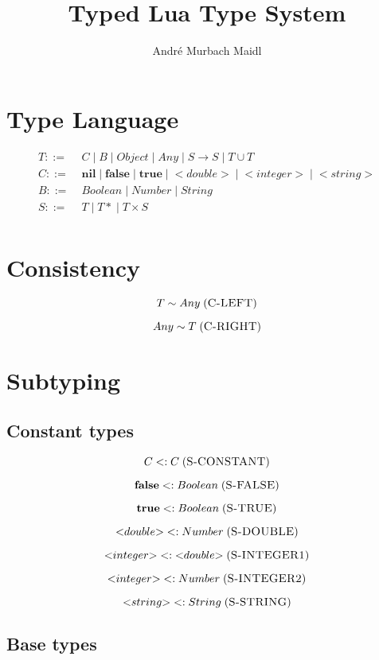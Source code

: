 \documentclass[12pt]{article}
\title{Typed Lua Type System}
\author{André Murbach Maidl}
\newcommand{\mylabel}[1]{\; (\textsc{#1})}
\newcommand{\subtype}{<:}
\newcommand{\pipe}{|\;}
\begin{document}
\maketitle

\section{Type Language}

\begin{align*}
T ::= \; & C \; \pipe B \; \pipe Object \; \pipe Any \; \pipe
S \rightarrow S \; \pipe T \cup T\\
C ::= \; & \mathbf{nil} \; \pipe \mathbf{false} \; \pipe \mathbf{true} \;
\pipe {<}double{>} \; \pipe {<}integer{>} \; \pipe {<}string{>}\\
B ::= \; & Boolean \; \pipe Number \; \pipe String\\
S ::= \; & T \; \pipe {T*} \; \pipe T \times S\\ 
\end{align*}

\section{Consistency}

\[
T \sim Any
\mylabel{C-LEFT}
\]

\[
Any \sim T
\mylabel{C-RIGHT}
\]

\section{Subtyping}

\subsection{Constant types}

\[
C \subtype C
\mylabel{S-CONSTANT}
\]

\[
\mathbf{false} \subtype Boolean
\mylabel{S-FALSE}
\]

\[
\mathbf{true} \subtype Boolean
\mylabel{S-TRUE}
\]

\[
{<}double{>} \subtype Number
\mylabel{S-DOUBLE}
\]

\[
{<}integer{>} \subtype {<}double{>}
\mylabel{S-INTEGER1}
\]

\[
{<}integer{>} \subtype Number
\mylabel{S-INTEGER2}
\]

\[
{<}string{>} \subtype String
\mylabel{S-STRING}
\]

\subsection{Base types}
\end{document}
